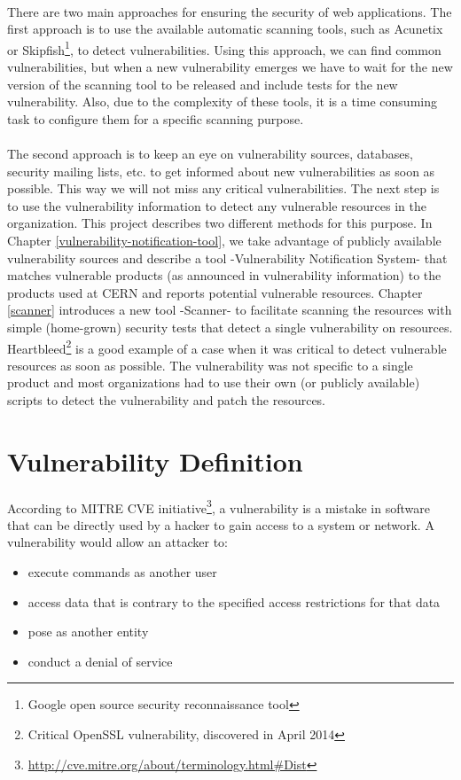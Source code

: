 \paragraph{}
There are two main approaches for ensuring the security of web applications. The first approach is to use the available automatic scanning tools, such as Acunetix or Skipfish\footnote{Google open source security reconnaissance tool}, to detect vulnerabilities. Using this approach, we can find common vulnerabilities, but when a new vulnerability emerges we have to wait for the new version of the scanning tool to be released and include tests for the new vulnerability. Also, due to the complexity of these tools, it is a time consuming task to configure them for a specific scanning purpose. 
\paragraph{}
The second approach is to keep an eye on vulnerability sources, databases, security mailing lists, etc. to get informed about new vulnerabilities as soon as possible. This way we will not miss any critical vulnerabilities. The next step is to use the vulnerability information to detect any vulnerable resources in the organization. This project describes two different methods for this purpose. In Chapter \ref{vulnerability-notification-tool}, we take advantage of publicly available vulnerability sources and describe a tool -Vulnerability Notification System- that matches  vulnerable products (as announced in vulnerability information) to the products used at CERN and reports potential vulnerable resources. Chapter \ref{scanner} introduces a new tool -Scanner- to facilitate scanning the resources with simple (home-grown) security tests that detect a single vulnerability on resources. Heartbleed\footnote{Critical OpenSSL vulnerability, discovered in April 2014} is a good example of a case when it was critical to detect vulnerable resources as soon as possible. The vulnerability was not specific to a single product and most organizations had to use their own (or publicly available) scripts to detect the vulnerability and patch the resources.

\section{Vulnerability Definition}
\paragraph{}
According to MITRE CVE initiative\footnote{\url{http://cve.mitre.org/about/terminology.html\#Dist}}, a vulnerability is a mistake in software that can be directly used by a hacker to gain access to a system or network. A vulnerability would allow an attacker to:
\begin{itemize}
\item execute commands as another user
\item access data that is contrary to the specified access restrictions for that data
\item pose as another entity
\item conduct a denial of service
\end{itemize}

